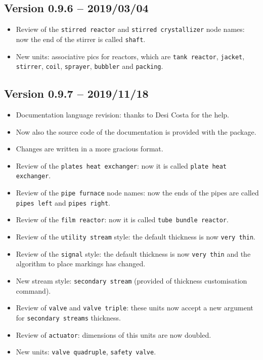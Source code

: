 \documentclass[12pt]{article}						%
\newcommand*{\chpn}[1]{\texttt{#1}}				%
\newcommand*{\chpp}[1]{\texttt{#1}}				%
\newcommand*{\chps}[1]{\texttt{#1}}				%
\begin{document}
\subsection*{Version 0.9.6 -- 2019/03/04}

\begin{itemize}
	\item Review of the \chpp{stirred reactor} and \chpp{stirred crystallizer}
		node names: now the end of the stirrer is called \chpn{shaft}.
	\item New units: associative pics for reactors, which are
		\chpp{tank reactor}, \chpp{jacket}, \chpp{stirrer}, \chpp{coil},
		\chpp{sprayer}, \chpp{bubbler} and \chpp{packing}.
\end{itemize}

\subsection*{Version 0.9.7 -- 2019/11/18}

\begin{itemize}
	\item Documentation language revision: thanks to Desi Costa for the help.
	\item Now also the source code of the documentation is provided with the
		package.
	\item Changes are written in a more gracious format.
	\item Review of the \chpp{plates heat exchanger}: now it is called
		\chpp{plate heat exchanger}.
	\item Review of the \chpp{pipe furnace} node names: now the ends of the
		pipes are called \chpn{pipes left} and \chpn{pipes right}.
	\item Review of the \chpp{film reactor}: now it is called
		\chpp{tube bundle reactor}.
	\item Review of the \chps{utility stream} style: the default thickness is now
		\verb|very thin|.
	\item Review of the \chps{signal} style: the default thickness is now
		\verb|very thin| and the algorithm to place markings has changed.
	\item New stream style: \chps{secondary stream} (provided of thickness
		customisation command).
	\item Review of \chpp{valve} and \chpp{valve triple}: these units now accept
		a new argument for \chps{secondary streams} thickness.
	\item Review of \chpp{actuator}: dimensions of this units are now doubled.
	\item New units: \chpp{valve quadruple}, \chpp{safety valve}.
\end{itemize}
\end{document}
